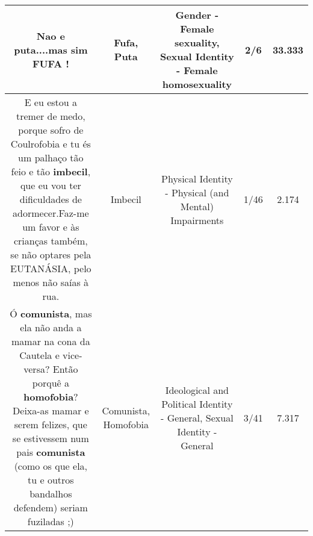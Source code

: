 \documentclass[11pt]{article}
\newlength\mylength
\begin{document}
\begin{center}
\begin{longtable}{|C{.65\mylength}|C{.30\mylength}|C{.12\mylength}|C{.12\mylength}|C{.12\mylength}|}
  \small Nao e \textbf{puta}....mas sim \textbf{FUFA} !\normalsize   & Fufa, Puta & Gender - Female sexuality, Sexual Identity - Female homosexuality & 2/6 & 33.333 \\  \hline
  \small E eu estou a tremer de medo, porque sofro de Coulrofobia e tu és um palhaço tão feio e tão \textbf{imbecil}, que eu  vou ter dificuldades de adormecer.Faz-me um favor e às crianças também, se não optares pela EUTANÁSIA, pelo menos não saías à rua.\normalsize   & Imbecil & Physical Identity - Physical (and Mental) Impairments & 1/46 & 2.174 \\  \hline
  \small Ó \textbf{comunista}, mas ela não anda a mamar na cona da Cautela e vice-versa? Então porquê a \textbf{homofobia}? Deixa-as mamar e serem felizes, que se estivessem num pais \textbf{comunista} (como os que ela, tu e outros bandalhos defendem) seriam fuziladas ;)\normalsize   & Comunista, Homofobia & Ideological and Political Identity - General, Sexual Identity - General & 3/41 & 7.317 \\  \hline
  
\end{longtable}
\end{center}
\end{document}
